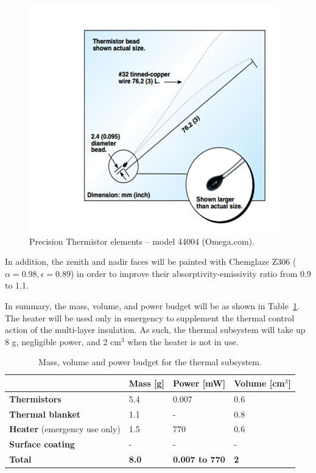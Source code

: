 \documentclass[12pt]{article}
\begin{document}
\begin{figure}[ht]%
\centering
\includegraphics{images/thermal-thermistor}%
\caption{Precision Thermistor elements -- model 44004 (Omega.com).\cite{omega}}%
\label{fig:thermal-thermistor}%
\end{figure}

In addition, the zenith and nadir faces will be painted with Chemglaze Z306 ($\alpha= 0.98, \epsilon = 0.89$) in order to improve their absorptivity-emissivity ratio from 0.9 to 1.1.

In summary, the mass, volume, and power budget will be as shown in Table~\ref{table:thermal-outputs}.  The heater will be used only in emergency to supplement the thermal control action of the multi-layer insulation. As such, the thermal subsystem will take up 8 g, negligible power, and 2 cm$^3$ when the heater is not in use.

\begin{table}[ht]%
\centering
\caption{Mass, volume and power budget for the thermal subsystem.}
\label{table:thermal-outputs}
\begin{tabular}{|l|l|l|l|}\hline
& \textbf{Mass} [g] & \textbf{Power} [mW] & \textbf{Volume} [cm$^3$] \\\hline
\textbf{Thermistors} & 5.4 & 0.007 & 0.6 \\\hline
\textbf{Thermal blanket} & 1.1 & -  & 0.8 \\\hline
\textbf{Heater} (emergency use only) & 1.5 & 770 & 0.6 \\\hline
\textbf{Surface coating} & - & - & - \\\hline
\textbf{Total} & \textbf{8.0} & \textbf{0.007 to 770} & \textbf{2} \\\hline
\end{tabular}
\end{table}
\end{document}
